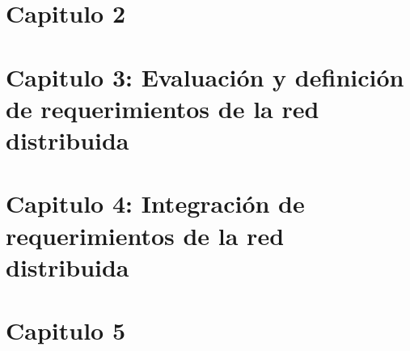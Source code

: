 \documentclass[10pt]{book}
\begin{document}
\chapter{Capitulo 2}\label{cap:Cap2}
%
\chapter{Capitulo 3: Evaluación y definición de requerimientos de la red distribuida}\label{cap:Cap3}
{}%
%
\chapter{Capitulo 4: Integración de requerimientos de la red distribuida}\label{cap:Cap4}
{}%
%
\chapter{Capitulo 5}\label{cap:Cap5}

\end{document}
